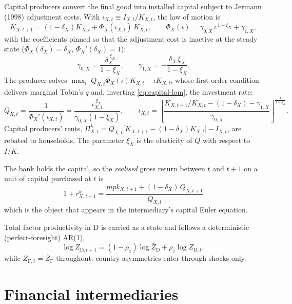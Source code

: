 \documentclass[11pt]{article}
\numberwithin{equation}{section}
\newcommand{\D}{\mathrm{D}}
\newcommand{\F}{\mathrm{F}}
\theoremstyle{definition}
\theoremstyle{plain}
\theoremstyle{remark}
\begin{document}
Capital producers convert the final good into installed capital subject to Jermann
(1998) adjustment costs. With $\iota_{X,t}\equiv I_{X,t}/K_{X,t}$, the law of motion is
\begin{equation}
K_{X,t+1}=(1-\delta_X)K_{X,t}+\Phi_X(\iota_{X,t})\,K_{X,t},
\qquad
\Phi_X(\iota)=\gamma_{0,X}\,\iota^{\,1-\xi_X}+\gamma_{1,X},
\label{eq:capital-lom}
\end{equation}
with the coefficients pinned so that the adjustment cost is inactive at the steady
state ($\Phi_X(\delta_X)=\delta_X$, $\Phi_X'(\delta_X)=1$):
\begin{equation}
\gamma_{0,X}=\frac{\delta_X^{\;\xi_X}}{1-\xi_X},
\qquad
\gamma_{1,X}=-\frac{\delta_X\,\xi_X}{1-\xi_X}.
\label{eq:jermann-coeffs}
\end{equation}
The producer solves $\max_{\iota}\;Q_{X,t}\Phi_X(\iota)K_{X,t}-\iota K_{X,t}$, whose
first-order condition delivers marginal Tobin's $q$ and, inverting
\eqref{eq:capital-lom}, the investment rate:
\begin{equation}
Q_{X,t}=\frac{1}{\Phi_X'(\iota_{X,t})}
      =\frac{\iota_{X,t}^{\;\xi_X}}{\gamma_{0,X}(1-\xi_X)},
\qquad
\iota_{X,t}=\left[\frac{K_{X,t+1}/K_{X,t}-(1-\delta_X)-\gamma_{1,X}}
                       {\gamma_{0,X}}\right]^{\frac{1}{1-\xi_X}} .
\label{eq:tobins-q}
\end{equation}
Capital producers' rents, $\Pi^{k}_{X,t}=Q_{X,t}\bigl[K_{X,t+1}-(1-\delta_X)K_{X,t}\bigr]-I_{X,t}$,
are rebated to households. The parameter $\xi_X$ is the elasticity of $Q$ with respect
to $I/K$.

The bank holds the capital, so the \emph{realised} gross return between $t$ and $t+1$
on a unit of capital purchased at $t$ is
\begin{equation}
\boxed{\;1+r^{k}_{X,t+1}=\frac{mpk_{X,t+1}+(1-\delta_X)\,Q_{X,t+1}}{Q_{X,t}}\;}
\label{eq:rk}
\end{equation}
which is the object that appears in the intermediary's capital Euler equation.

Total factor productivity in $\D$ is carried as a state and follows a deterministic
(perfect-foresight) AR(1),
\begin{equation}
\log Z_{\D,t+1}=(1-\rho_z)\log \bar Z_{\D}+\rho_z\log Z_{\D,t},
\label{eq:tfp}
\end{equation}
while $Z_{\F,t}=\bar Z_{\F}$ throughout: country asymmetries enter through shocks
only.

\section{Financial intermediaries}
\label{sec:banks}
\end{document}
